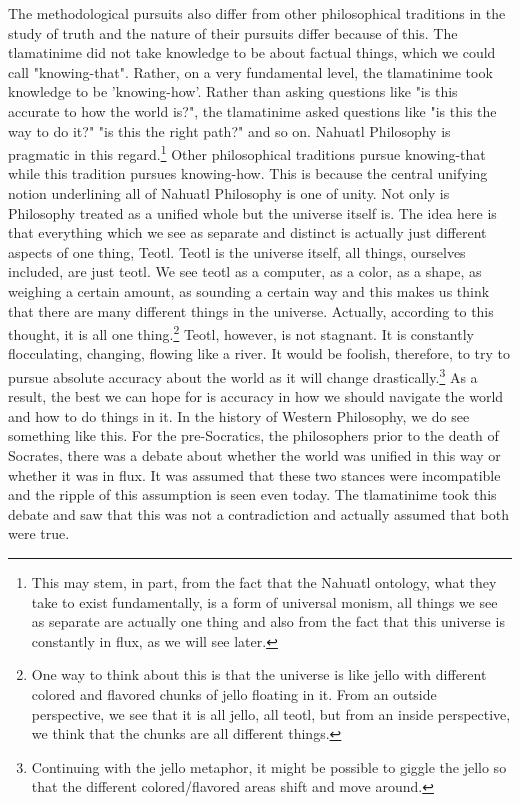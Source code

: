 The methodological pursuits also differ from other philosophical traditions in the study of truth and the nature of their pursuits differ because of this. The tlamatinime did not take knowledge to be about factual things, which we could call "knowing-that". Rather, on a very fundamental level, the tlamatinime took knowledge to be 'knowing-how'. Rather than asking questions like "is this accurate to how the world is?", the tlamatinime asked questions like "is this the way to do it?" "is this the right path?" and so on. Nahuatl Philosophy is pragmatic in this regard.\footnote{This may stem, in part, from the fact that the Nahuatl ontology, what they take to exist fundamentally, is a form of universal monism, all things we see as separate are actually one thing and also from the fact that this universe is constantly in flux, as we will see later.} Other philosophical traditions pursue knowing-that while this tradition pursues knowing-how. This is because the central unifying notion underlining all of Nahuatl Philosophy is one of unity. Not only is Philosophy treated as a unified whole but the universe itself is. The idea here is that everything which we see as separate and distinct is actually just different aspects of one thing, \Gls{Teotl}. Teotl is the universe itself, all things, ourselves included, are just teotl. We see teotl as a computer, as a color, as a shape, as weighing a certain amount, as sounding a certain way and this makes us think that there are many different things in the universe. Actually, according to this thought, it is all one thing.\footnote{One way to think about this is that the universe is like jello with different colored and flavored chunks of jello floating in it. From an outside perspective, we see that it is all jello, all teotl, but from an inside perspective, we think that the chunks are all different things.} Teotl, however, is not stagnant. It is constantly flocculating, changing, flowing like a river. It would be foolish, therefore, to try to pursue absolute accuracy about the world as it will change drastically.\footnote{Continuing with the jello metaphor, it might be possible to giggle the jello so that the different colored/flavored areas shift and move around.} As a result, the best we can hope for is accuracy in how we should navigate the world and how to do things in it. In the history of Western Philosophy, we do see something like this. For the pre-Socratics, the philosophers prior to the death of Socrates, there was a debate about whether the world was unified in this way or whether it was in flux. It was assumed that these two stances were incompatible and the ripple of this assumption is seen even today. The tlamatinime took this debate and saw that this was not a contradiction and actually assumed that both were true. 

